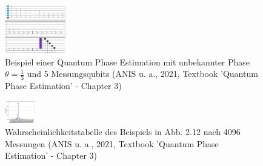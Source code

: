 \begin{figure}
    \includegraphics[width=100]{content/qpe-example.jpeg}
    \caption{Beispiel einer Quantum Phase Estimation mit unbekannter Phase \(\theta = \frac{1}{3}\) und 5 Messungsqubits  (ANIS u. a., 2021, Textbook ’Quantum Phase Estimation’ - Chapter 3)}
\end{figure}\newline

\begin{figure}
    \includegraphics[width=50]{content/qpe-example-prob.JPG}
    \caption{Wahrscheinlichkeitstabelle des Beispiels in Abb. 2.12 nach 4096 Messungen  (ANIS u. a., 2021, Textbook ’Quantum Phase Estimation’ - Chapter 3)}
\end{figure}\newline

